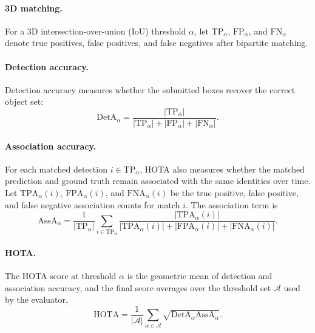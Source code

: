 \documentclass[runningheads]{llncs}
\begin{document}
\paragraph{3D matching.}
For a 3D intersection-over-union (IoU) threshold $\alpha$, let $\mathrm{TP}_{\alpha}$,
$\mathrm{FP}_{\alpha}$, and $\mathrm{FN}_{\alpha}$ denote true positives, false
positives, and false negatives after bipartite matching.

\paragraph{Detection accuracy.}
Detection accuracy measures whether the submitted boxes recover the correct
object set:
\begin{equation}
    \mathrm{DetA}_{\alpha}
    =
    \frac{|\mathrm{TP}_{\alpha}|}
    {|\mathrm{TP}_{\alpha}|+|\mathrm{FP}_{\alpha}|+|\mathrm{FN}_{\alpha}|}.
    \label{eq:deta}
\end{equation}

\paragraph{Association accuracy.}
For each matched detection $i\in\mathrm{TP}_{\alpha}$, HOTA also measures whether
the matched prediction and ground truth remain associated with the same identities
over time. Let $\mathrm{TPA}_{\alpha}(i)$, $\mathrm{FPA}_{\alpha}(i)$, and
$\mathrm{FNA}_{\alpha}(i)$ be the true positive, false positive, and false
negative association counts for match $i$. The association term is
\begin{equation}
    \mathrm{AssA}_{\alpha}
    =
    \frac{1}{|\mathrm{TP}_{\alpha}|}
    \sum_{i\in\mathrm{TP}_{\alpha}}
    \frac{|\mathrm{TPA}_{\alpha}(i)|}
    {|\mathrm{TPA}_{\alpha}(i)|+
     |\mathrm{FPA}_{\alpha}(i)|+
     |\mathrm{FNA}_{\alpha}(i)|}.
    \label{eq:assa}
\end{equation}

\paragraph{HOTA.}
The HOTA score at threshold $\alpha$ is the geometric mean of detection and
association accuracy, and the final score averages over the threshold set
$\mathcal{A}$ used by the evaluator,
\begin{equation}
    \mathrm{HOTA}
    =
    \frac{1}{|\mathcal{A}|}
    \sum_{\alpha\in\mathcal{A}}
    \sqrt{\mathrm{DetA}_{\alpha}\mathrm{AssA}_{\alpha}}.
    \label{eq:hota}
\end{equation}
\end{document}
